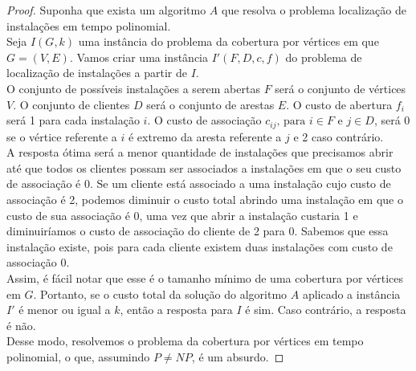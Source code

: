 \documentclass[12pt]{article}
\newcommand{\NP}{\mathit{NP}}
\begin{document}
\begin{proof}
    Suponha que exista um algoritmo $A$ que resolva o problema localização de instalações em tempo polinomial. \\
    Seja $I(G,k)$ uma instância do problema da cobertura por vértices em que $G = (V,E)$. Vamos criar uma instância $I'(F,D,c,f)$ do problema de localização de instalações a partir de $I$.\\
    O conjunto de possíveis instalações a serem abertas $F$ será o conjunto de vértices $V$. O conjunto de clientes $D$ será o conjunto de arestas $E$. O custo de abertura $f_i$ será 1 para cada instalação $i$. O custo de associação $c_{ij} \text{, para } i \in F \text{ e } j \in D$, será 0 se o vértice referente a $i$ é extremo da aresta referente a $j$ e 2 caso contrário. \\
    A resposta ótima será a menor quantidade de instalações que precisamos abrir até que todos os clientes possam ser associados a instalações em que o seu custo de associação é 0. Se um cliente está associado a uma instalação cujo custo de associação é 2, podemos diminuir o custo total abrindo uma instalação em que o custo de sua associação é 0, uma vez que abrir a instalação custaria 1 e diminuiríamos o custo de associação do cliente de 2 para 0. Sabemos que essa instalação existe, pois para cada cliente existem duas instalações com custo de associação 0. \\
    Assim, é fácil notar que esse é o tamanho mínimo de uma cobertura por vértices em $G$. Portanto, se o custo total da solução do algoritmo $A$ aplicado a instância $I'$ é menor ou igual a $k$, então a resposta para $I$ é sim. Caso contrário, a resposta é não. \\
    Desse modo, resolvemos o problema da cobertura por vértices em tempo polinomial, o que, assumindo $P\neq\NP$, é um absurdo.
\end{proof}
\end{document}
